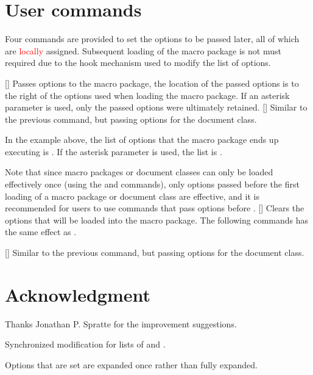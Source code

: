 \documentclass[load-preamble+]{cnltx-doc}
\begin{document}
\section{User commands}
Four commands are provided to set the options to be passed later, all of which are \textcolor{red}{locally} assigned. Subsequent loading of the macro package is not must required due to the hook mechanism used to modify the list of options.
\begin{commands}
  [\sarg{}]
  Passes options to the macro package, the location of the passed options is to the right of the options used when loading the macro package. If an asterisk parameter is used, only the passed options were ultimately retained.
  [\sarg{}]
  Similar to the previous command, but passing options for the document class.

  In the example above, the list of options that the  macro package ends up executing is . If the asterisk parameter is used, the list is .

  Note that since macro packages or document classes can only be loaded effectively once (using the  and  commands), only options passed before the first loading of a macro package or document class are effective, and it is recommended for users to use commands that pass options before .
  []
  Clears the options that will be loaded into the macro package. The following commands has the same effect as \code{*}.
\begin{codehigh}
\end{codehigh}
  []
  Similar to the previous command, but passing options for the document class.
\end{commands}

\section{Acknowledgment}
Thanks Jonathan P. Spratte for the improvement suggestions.

\appendix
\begin{changelog}[simple]
  \begin{version}[v = 1.01,date = 2024/07/15]
  \item Synchronized modification for lists of  and .
  \item Options that are set are expanded once rather than fully expanded.
  \end{version}
\end{changelog}
\nocite{*}
\end{document}
